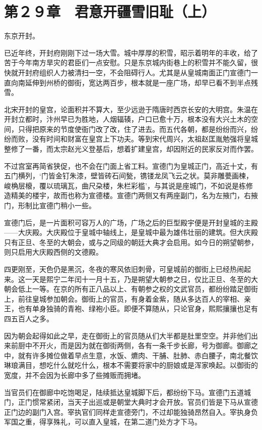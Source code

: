 \section{第２９章　君意开疆雪旧耻（上）}

东京开封。

已近年终，开封府刚刚下过一场大雪。城中厚厚的积雪，昭示着明年的丰收，给了苦于今年南方旱灾的君臣们一点安慰。只是东京城内街巷上的积雪并不能久留，很快就开封府组织人力被清扫一空，不会阻碍行人。尤其是从皇城南面正门宣德门一直向南延伸到州桥的御街，宽达两百步，根本就是一座广场，却早已看不到半点残雪。

北宋开封的皇宫，论面积并不算大，至少远逊于隋唐时西京长安的大明宫。朱温在开封立都时，汴州早已为胜地，人烟辐辏，户口已愈十万，根本没有大兴土木的空间，只得把原来的节度使衙门改了改，住了进去。而五代各朝，都是纷纷而兴，纷纷而败，没有时间和财富在皇宫上下功夫。等到宋代周兴，太祖赵匡胤勉强将皇城整修了一番，而太宗赵光义登基后，想着扩建皇宫，却因附近的民家反对而作罢。

不过宫室再简省狭促，也不会在门面上省工料。宣德门为皇城正门，高近十丈，有五门横列，‘门皆金钉朱漆，壁皆砖石间甃，镌镂龙凤飞云之状。莫非雕甍画楝，峻桷层榱，覆以琉璃瓦，曲尺朶楼，朱栏彩槛’，与其说是座城门，不如说是栋修造精美的楼宇，故而也称为宣德楼。宣德门两侧又有两座副门，名为左掖门，右掖门，形制比宣德门稍小一些。

宣德门后，是一片面积可容万人的广场，广场之后的巨型殿宇便是开封皇城的主殿——大庆殿。大庆殿位于皇城中轴线上，是皇城中最为雄伟壮丽的建筑。但大庆殿只有正旦、冬至的大朝会，或与之同级的朝廷大典才会启用。如今日的朔望朝参，则只启用大庆殿西侧的文德殿。

四更刚至，天色仍是黑沉，冬夜的寒风依旧刺骨，可皇城前的御街上已经热闹起来。这一天是熙宁二年闰十一月十五，乃是朔望大朝参之日，仅比正旦、冬至的大朝会低上一等。在京的所有正八品以上、有朝参之权的文武官员，都纷纷踏足御街上，前往皇城参加朝会。御街上的官员，有身着金紫，随从多达百人的宰相、亲王，也有单身独骑的青袍、绿袍小臣。即便不算随从，只论官身，熙熙攘攘也足有四五百人之多。

因为朝会起得如此之早，走在御街上的官员随从们大半都是肚里空空。并非他们出来前厨中不开火，而是因为就在御街两侧，各有一条千步长廊，号为御廊。御廊之中，就有许多摊位做着早点生意，水饭、爊肉、干脯、肚肺、赤白腰子，南北餐饮琳琅满目，想吃什么就吃什么，根本不需要将家中的厨娘或是浑家唤起。以御街的宽度，并不会因为长廊中多了些摊贩而拥堵。

当官员们在御廊中吃饱喝足，陆续抵达皇城脚下后，都纷纷下马。宣德门五道城门，正门惯常紧闭，当天子出巡或是朝堂大典时才会开放。官员们皆是下马从宣德正门边的副门入宫。宰执官们同样走宣德旁门，不过却能独骑昂然自入。宰执身负军国之重，得享殊礼，可以直入皇城，在第二道门处方才下马。

